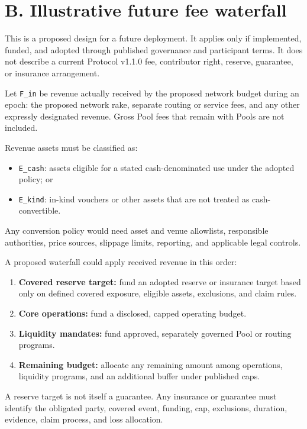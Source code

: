 \documentclass[11pt]{article}
\begin{document}
\section*{B. Illustrative future fee waterfall}

This is a proposed design for a future deployment. It applies only if implemented, funded, and adopted through published governance and participant terms. It does not describe a current Protocol v1.1.0 fee, contributor right, reserve, guarantee, or insurance arrangement.

Let \texttt{F\_in} be revenue actually received by the proposed network budget during an epoch: the proposed network rake, separate routing or service fees, and any other expressly designated revenue. Gross Pool fees that remain with Pools are not included.

Revenue assets must be classified as:

\begin{itemize}[leftmargin=*]
\item \texttt{E\_cash}: assets eligible for a stated cash-denominated use under the adopted policy; or
\item \texttt{E\_kind}: in-kind vouchers or other assets that are not treated as cash-convertible.
\end{itemize}
Any conversion policy would need asset and venue allowlists, responsible authorities, price sources, slippage limits, reporting, and applicable legal controls.

A proposed waterfall could apply received revenue in this order:

\begin{enumerate}[leftmargin=*]
\item \textbf{Covered reserve target:} fund an adopted reserve or insurance target based only on defined covered exposure, eligible assets, exclusions, and claim rules.
\item \textbf{Core operations:} fund a disclosed, capped operating budget.
\item \textbf{Liquidity mandates:} fund approved, separately governed Pool or routing programs.
\item \textbf{Remaining budget:} allocate any remaining amount among operations, liquidity programs, and an additional buffer under published caps.
\end{enumerate}
A reserve target is not itself a guarantee. Any insurance or guarantee must identify the obligated party, covered event, funding, cap, exclusions, duration, evidence, claim process, and loss allocation.
\end{document}
